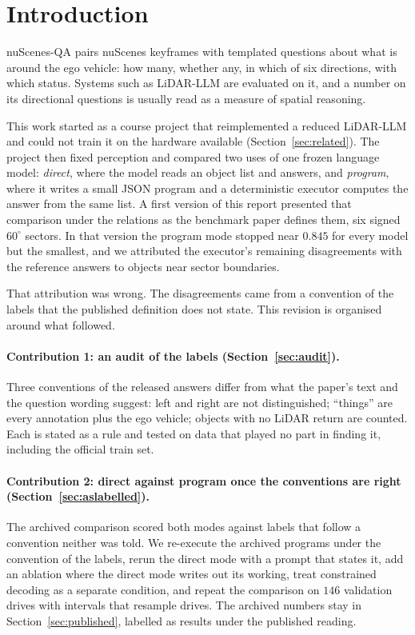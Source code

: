 \documentclass[11pt,a4paper]{article}
\begin{document}
\section{Introduction}

nuScenes-QA \cite{nuscenesqa} pairs nuScenes keyframes \cite{nuscenes} with
templated questions about what is around the ego vehicle: how many, whether
any, in which of six directions, with which status. Systems such as LiDAR-LLM
\cite{lidarllm} are evaluated on it, and a number on its directional
questions is usually read as a measure of spatial reasoning.

This work started as a course project that reimplemented a reduced LiDAR-LLM
and could not train it on the hardware available (Section~\ref{sec:related}).
The project then fixed perception and compared two uses of one frozen
language model: \emph{direct}, where the model reads an object list and
answers, and \emph{program}, where it writes a small JSON program and a
deterministic executor computes the answer from the same list. A first
version of this report presented that comparison under the relations as the
benchmark paper defines them, six signed $60^{\circ}$ sectors. In that
version the program mode stopped near $0.845$ for every model but the smallest, and we attributed the executor's remaining
disagreements with the reference answers to objects near sector boundaries.

That attribution was wrong. The disagreements came from a convention of the
labels that the published definition does not state. This revision is
organised around what followed.

\paragraph{Contribution 1: an audit of the labels
(Section~\ref{sec:audit}).} Three conventions of the released answers differ
from what the paper's text and the question wording suggest: left and right
are not distinguished; ``things'' are every annotation plus the ego vehicle;
objects with no LiDAR return are counted. Each is stated as a rule and tested
on data that played no part in finding it, including the official train set.

\paragraph{Contribution 2: direct against program once the conventions are
right (Section~\ref{sec:aslabelled}).} The archived comparison scored both
modes against labels that follow a convention neither was told. We
re-execute the archived programs under the convention of the labels, rerun
the direct mode with a prompt that states it, add an ablation where the
direct mode writes out its working, treat constrained decoding as a separate
condition, and repeat the comparison on $146$ validation drives with
intervals that resample drives. The archived numbers stay in
Section~\ref{sec:published}, labelled as results under the published reading.
\end{document}

